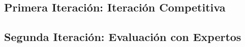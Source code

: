 \subsection{Primera Iteración: Iteración Competitiva}
\label{cap:subsec:iteracionCompetitiva}


\subsection{Segunda Iteración: Evaluación con Expertos}
\label{cap:subsec:evaluacionExpertos}
